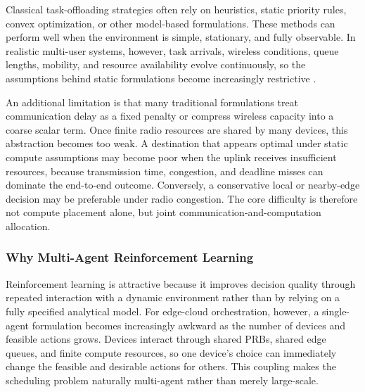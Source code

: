 Classical task-offloading strategies often rely on heuristics, static priority rules, convex optimization, or other model-based formulations. These methods can perform well when the environment is simple, stationary, and fully observable. In realistic multi-user systems, however, task arrivals, wireless conditions, queue lengths, mobility, and resource availability evolve continuously, so the assumptions behind static formulations become increasingly restrictive \cite{luo2024survey, robles2023multilayer}.

An additional limitation is that many traditional formulations treat communication delay as a fixed penalty or compress wireless capacity into a coarse scalar term. Once finite radio resources are shared by many devices, this abstraction becomes too weak. A destination that appears optimal under static compute assumptions may become poor when the uplink receives insufficient resources, because transmission time, congestion, and deadline misses can dominate the end-to-end outcome. Conversely, a conservative local or nearby-edge decision may be preferable under radio congestion. The core difficulty is therefore not compute placement alone, but joint communication-and-computation allocation.

\subsubsection{Why Multi-Agent Reinforcement Learning}

Reinforcement learning is attractive because it improves decision quality through repeated interaction with a dynamic environment rather than by relying on a fully specified analytical model. For edge-cloud orchestration, however, a single-agent formulation becomes increasingly awkward as the number of devices and feasible actions grows. Devices interact through shared PRBs, shared edge queues, and finite compute resources, so one device's choice can immediately change the feasible and desirable actions for others. This coupling makes the scheduling problem naturally multi-agent rather than merely large-scale.

